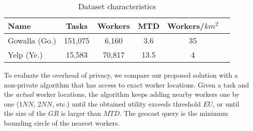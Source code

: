 \documentclass{USC-Thesis}
\newcommand{\tn}{\tabularnewline}
\numberwithin{equation}{chapter}
\begin{document}
\begin{table}
\begin{center}
\footnotesize
\begin{tabular}{ l | c |  c | c | c | r}
\hline
\textbf{Name} & \textbf{Tasks} & \textbf{Workers} & \textbf{MTD} & \textbf{Workers/$km^2$} \tn
\hline
Gowalla (Go.) & 151,075 & 6,160 & 3.6 & 35   \tn
\hline
Yelp (Ye.) & 15,583 & 70,817 & 13.5 & 4  \tn
\hline
\end{tabular}
\caption{Dataset characteristics}
\label{tab:real_datasets}
\end{center}
\end{table}

\begin{comment}
\begin{figure*}[ht]
	\begin{minipage}[b]{0.33\linewidth}
	\centering
		\texttt{[image: exps/gowalla\_sf\_workers]}
		\subcaption{Gowalla, San Francisco}
		\label{fig:gowalla_sf}	
	\end{minipage}
	\begin{minipage}[b]{0.33\linewidth}
	\centering
		\texttt{[image: exps/yelp\_workers]}
		\subcaption{Yelp, Greater Phoenix}
		\label{fig:yelp}	
	\end{minipage}
	\begin{minipage}[b]{0.33\linewidth}
	\centering
		\texttt{[image: exps/foursquare\_workers]}
		\subcaption{Foursquare, Pittsburgh}
		\label{fig:foursquare}	
	\end{minipage}
\caption{Worker distributions in real-world datasets (one time snapshot)}
\label{fig:data_distribution}
\end{figure*}
\end{comment}


To evaluate the overhead of privacy, we compare our proposed solution with a non-private algorithm that has access to exact worker locations. Given a task and the {\em actual} worker locations, the algorithm keeps adding nearby workers one by one (1$\mathit{NN}$, 2$\mathit{NN}$, etc.) until the obtained utility exceeds threshold $\mathit{EU}$, or until the size of the $GR$ is larger than $\mathit{MTD}$. The geocast query is the minimum bounding circle of the nearest workers.
\end{document}
